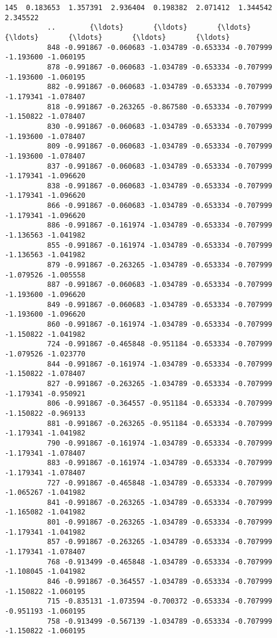 \documentclass[11pt]{article}
\begin{document}
\begin{Verbatim}[commandchars=\\\{\}]
          145  0.183653  1.357391  2.936404  0.198382  2.071412  1.344542  2.345522   
          ..        {\ldots}       {\ldots}       {\ldots}       {\ldots}       {\ldots}       {\ldots}       {\ldots}   
          848 -0.991867 -0.060683 -1.034789 -0.653334 -0.707999 -1.193600 -1.060195   
          878 -0.991867 -0.060683 -1.034789 -0.653334 -0.707999 -1.193600 -1.060195   
          882 -0.991867 -0.060683 -1.034789 -0.653334 -0.707999 -1.179341 -1.078407   
          818 -0.991867 -0.263265 -0.867580 -0.653334 -0.707999 -1.150822 -1.078407   
          830 -0.991867 -0.060683 -1.034789 -0.653334 -0.707999 -1.193600 -1.078407   
          809 -0.991867 -0.060683 -1.034789 -0.653334 -0.707999 -1.193600 -1.078407   
          837 -0.991867 -0.060683 -1.034789 -0.653334 -0.707999 -1.179341 -1.096620   
          838 -0.991867 -0.060683 -1.034789 -0.653334 -0.707999 -1.179341 -1.096620   
          866 -0.991867 -0.060683 -1.034789 -0.653334 -0.707999 -1.179341 -1.096620   
          886 -0.991867 -0.161974 -1.034789 -0.653334 -0.707999 -1.136563 -1.041982   
          855 -0.991867 -0.161974 -1.034789 -0.653334 -0.707999 -1.136563 -1.041982   
          879 -0.991867 -0.263265 -1.034789 -0.653334 -0.707999 -1.079526 -1.005558   
          887 -0.991867 -0.060683 -1.034789 -0.653334 -0.707999 -1.193600 -1.096620   
          849 -0.991867 -0.060683 -1.034789 -0.653334 -0.707999 -1.193600 -1.096620   
          860 -0.991867 -0.161974 -1.034789 -0.653334 -0.707999 -1.150822 -1.041982   
          724 -0.991867 -0.465848 -0.951184 -0.653334 -0.707999 -1.079526 -1.023770   
          844 -0.991867 -0.161974 -1.034789 -0.653334 -0.707999 -1.150822 -1.078407   
          827 -0.991867 -0.263265 -1.034789 -0.653334 -0.707999 -1.179341 -0.950921   
          806 -0.991867 -0.364557 -0.951184 -0.653334 -0.707999 -1.150822 -0.969133   
          881 -0.991867 -0.263265 -0.951184 -0.653334 -0.707999 -1.179341 -1.041982   
          790 -0.991867 -0.161974 -1.034789 -0.653334 -0.707999 -1.179341 -1.078407   
          883 -0.991867 -0.161974 -1.034789 -0.653334 -0.707999 -1.179341 -1.078407   
          727 -0.991867 -0.465848 -1.034789 -0.653334 -0.707999 -1.065267 -1.041982   
          841 -0.991867 -0.263265 -1.034789 -0.653334 -0.707999 -1.165082 -1.041982   
          801 -0.991867 -0.263265 -1.034789 -0.653334 -0.707999 -1.179341 -1.041982   
          857 -0.991867 -0.263265 -1.034789 -0.653334 -0.707999 -1.179341 -1.078407   
          768 -0.913499 -0.465848 -1.034789 -0.653334 -0.707999 -1.108045 -1.041982   
          846 -0.991867 -0.364557 -1.034789 -0.653334 -0.707999 -1.150822 -1.060195   
          715 -0.835131 -1.073594 -0.700372 -0.653334 -0.707999 -0.951193 -1.060195   
          758 -0.913499 -0.567139 -1.034789 -0.653334 -0.707999 -1.150822 -1.060195   
          

\end{Verbatim}
\end{document}
